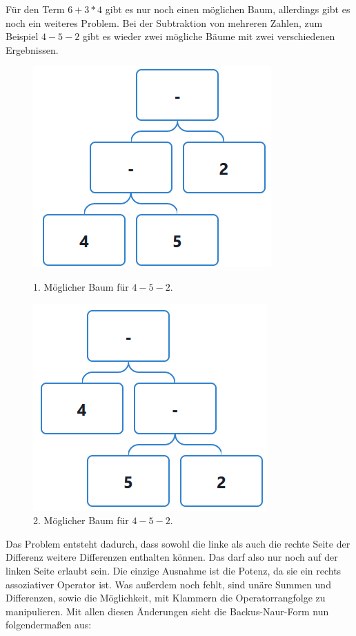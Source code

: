 \documentclass[11pt]{article}
\begin{document}
Für den Term $6+3*4$ gibt es nur noch einen möglichen Baum,
allerdings gibt es noch ein weiteres Problem. 
Bei der Subtraktion von mehreren Zahlen, 
zum Beispiel $4-5-2$ gibt es wieder zwei mögliche Bäume 
mit zwei verschiedenen Ergebnissen. 

\begin{figure}[h]
\begin{minipage}{.5\textwidth}
  \centering
  \includegraphics[scale=0.5]{trees/beispiel_bnf_3_1.png}
  \caption{1. Möglicher Baum für $4-5-2$.}
\end{minipage}
\begin{minipage}{.5\textwidth}
  \centering
  \includegraphics[scale=0.5]{trees/beispiel_bnf_3_2.png}
  \caption{2. Möglicher Baum für $4-5-2$.}
\end{minipage}
\end{figure}

Das Problem entsteht dadurch, dass sowohl die linke als auch 
die rechte Seite der Differenz weitere Differenzen enthalten können. 
Das darf also nur noch auf der linken Seite erlaubt sein. 
Die einzige Ausnahme ist die Potenz, da sie ein rechts assoziativer Operator ist. 
Was außerdem noch fehlt, sind unäre Summen und Differenzen, 
sowie die Möglichkeit, mit Klammern die Operatorrangfolge zu manipulieren. 
Mit allen diesen Änderungen sieht die Backus-Naur-Form nun folgendermaßen aus:
\end{document}
